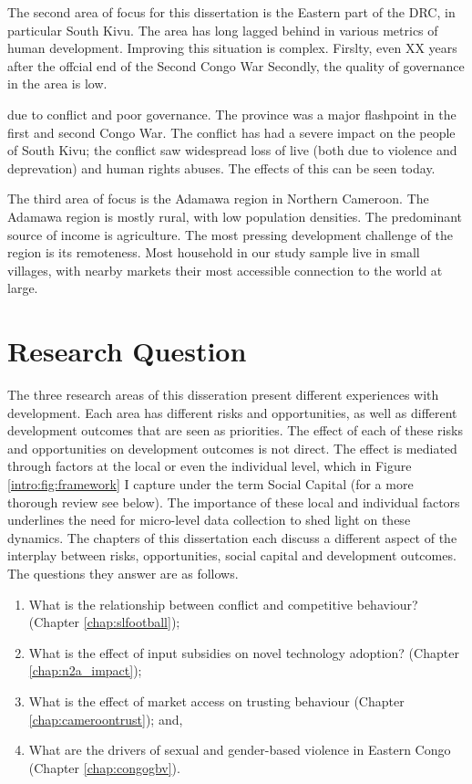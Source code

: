 The second area of focus for this dissertation is the Eastern part of the DRC, in particular South Kivu. The area has long lagged behind in various metrics of human development.  Improving this situation is complex. Firslty, even XX years after the offcial end of the Second Congo War   Secondly, the quality of governance in the area is low.  


due to conflict and poor governance. The province was a major flashpoint in the first and second Congo War. The conflict has had a severe impact on the people of South Kivu; the conflict saw widespread loss of live (both due to violence and deprevation) and human rights abuses. The effects of this can be seen today. 

The third area of focus is the Adamawa region in Northern Cameroon. The Adamawa region is mostly rural, with low population densities. The predominant source of income is agriculture. The most pressing development challenge of the region is its remoteness. Most household in our study sample live in small villages, with nearby markets their most accessible connection to the world at large. 

\section{Research Question}
The three research areas of this disseration present different experiences with development. Each area has different risks and opportunities, as well as different development outcomes that are seen as priorities. The effect of each of these risks and opportunities on development outcomes is not direct. The effect is mediated through factors at the local or even the individual level, which in Figure \ref{intro:fig:framework} I capture under the term Social Capital (for a more thorough review see below). The importance of these local and individual factors underlines the need for micro-level data collection to shed light on these dynamics. The chapters of this dissertation each discuss a different aspect of the interplay between risks, opportunities, social capital and development outcomes. The questions they answer are as follows.
\begin{enumerate}
	\item What is the relationship between conflict and competitive behaviour? (Chapter \ref{chap:slfootball});
	\item What is the effect of input subsidies on novel technology adoption? (Chapter \ref{chap:n2a_impact});
	\item What is the effect of market access on trusting behaviour (Chapter \ref{chap:cameroontrust}); and,
	\item What are the drivers of sexual and gender-based violence in Eastern Congo (Chapter \ref{chap:congogbv}).
\end{enumerate}


